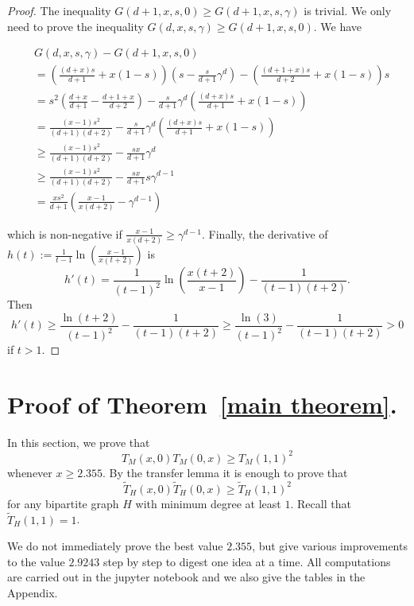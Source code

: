 \documentclass[12pt,a4paper]{amsart}
\numberwithin{equation}{section}
\theoremstyle{plain}
\theoremstyle{definition}
\newcommand{\1}{\textbf{1}}
\newcommand{\wT}{\widetilde{T}}
\begin{document}
    


\begin{proof}
The inequality $G(d+1,x,s,0)\geqslant G(d+1,x,s,\gamma)$ is trivial. We only need to prove the inequality $G(d,x,s,\gamma)\geqslant G(d+1,x,s,0)$.
We have
\begin{small}
\begin{align*}
&G(d,x,s,\gamma)-G(d+1,x,s,0)\\
&=\left(\frac{(d+x)s}{d+1}+x(1-s)\right)\left(s-\frac{s}{d+1}\gamma^d\right)-\left(\frac{(d+1+x)s}{d+2}+x(1-s)\right)s\\
&=s^2\left(\frac{d+x}{d+1}-\frac{d+1+x}{d+2}\right)-\frac{s}{d+1}\gamma^d\left(\frac{(d+x)s}{d+1}+x(1-s)\right)\\
&= \frac{(x-1)s^2}{(d+1)(d+2)}-\frac{s}{d+1}\gamma^d\left(\frac{(d+x)s}{d+1}+x(1-s)\right)\\
&\geqslant \frac{(x-1)s^2}{(d+1)(d+2)}-\frac{sx}{d+1}\gamma^d\\
&\geqslant \frac{(x-1)s^2}{(d+1)(d+2)}-\frac{sx}{d+1}s\gamma^{d-1}\\
&=\frac{xs^2}{d+1}\left(\frac{x-1}{x(d+2)}-\gamma^{d-1}\right)
\end{align*}
\end{small}
which is non-negative if $\frac{x-1}{x(d+2)}\geqslant \gamma^{d-1}$. 
Finally, the derivative of $h(t):=\frac{1}{t-1}\ln \left(\frac{x-1}{x(t+2)}\right)$ is 
$$h'(t)=\frac{1}{(t-1)^2}\ln \left(\frac{x(t+2)}{x-1}\right)-\frac{1}{(t-1)(t+2)}.$$
Then
$$h'(t)\geqslant \frac{\ln(t+2)}{(t-1)^2}-\frac{1}{(t-1)(t+2)}\geqslant \frac{\ln(3)}{(t-1)^2}-\frac{1}{(t-1)(t+2)}>0$$
if $t>1$.
\end{proof}

\section{Proof of Theorem~\ref{main theorem}.} 
\label{sect: proof_main_theorem}

In this section, we prove that
$$T_M(x,0)T_M(0,x)\geqslant T_M(1,1)^2$$
whenever $x\geqslant 2.355$. By the transfer lemma it is enough to prove that
$$\wT_H(x,0)\wT_H(0,x)\geqslant \wT_H(1,1)^2$$
for any bipartite graph $H$ with minimum degree at least $1$. Recall that $\wT_H(1,1)=1$. 

We do not immediately prove the best value $2.355$, but give various improvements to the value $2.9243$ step by step to digest one idea at a time. All computations are carried out in the jupyter notebook \cite{JUP} and we also give the tables in the Appendix.
\bigskip
\end{document}
